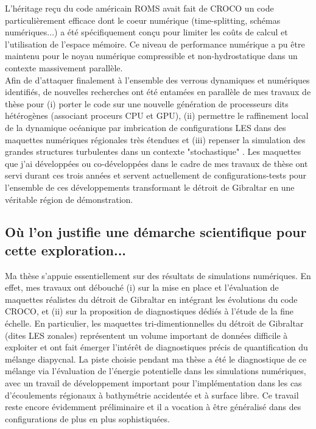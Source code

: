 L'héritage reçu du code américain ROMS \citep{shchepetkin_regional_2005} avait fait de CROCO un code particulièrement efficace dont le coeur numérique (time-splitting, schémas numériques...) a été spécifiquement conçu pour limiter les coûts de calcul et l'utilisation de l'espace mémoire. Ce niveau de performance numérique a pu être maintenu pour le noyau numérique compressible et non-hydrostatique dans un contexte massivement parallèle.\\
Afin de d'attaquer finalement à l'ensemble des verrous dynamiques et numériques identifiés, de nouvelles recherches ont été entamées en parallèle de mes travaux de thèse pour (i) porter le code sur une nouvelle génération de processeurs dits hétérogènes (associant proceurs CPU et GPU), (ii) permettre le raffinement local de la dynamique océanique par imbrication de configurations LES dans des maquettes numériques régionales très étendues et (iii) repenser la simulation des grandes structures turbulentes dans un contexte "stochastique" \cite{memin_fluid_2014}. Les maquettes que j'ai développées ou co-développées dans le cadre de mes travaux de thèse ont servi durant ces trois années et servent actuellement de configurations-tests pour l'ensemble de ces développements transformant le détroit de Gibraltar en une véritable région de démonstration. 
\color{blue}

\subsection{Où l'on justifie une démarche scientifique pour cette exploration...}

Ma thèse s'appuie essentiellement sur des résultats de simulations numériques. En effet, mes travaux ont débouché (i) sur la mise en place et l'évaluation de maquettes réalistes du détroit de Gibraltar en intégrant les évolutions du code CROCO, et (ii) sur la proposition de diagnostiques dédiés à l'étude de la fine échelle. En particulier, les maquettes tri-dimentionnelles du détroit de Gibraltar (dites LES zonales) représentent un volume important de données difficile à exploiter et ont fait émerger l'intérêt de diagnostiques précis de quantification du mélange diapycnal. La piste choisie pendant ma thèse a été le diagnostique de ce mélange via l'évaluation de l'énergie potentielle dans les simulations numériques, avec un travail de développement important pour l'implémentation dans les cas d'écoulements régionaux à bathymétrie accidentée et à surface libre. Ce travail reste encore évidemment préliminaire et il a vocation à être généralisé dans des configurations de plus en plus sophistiquées.


